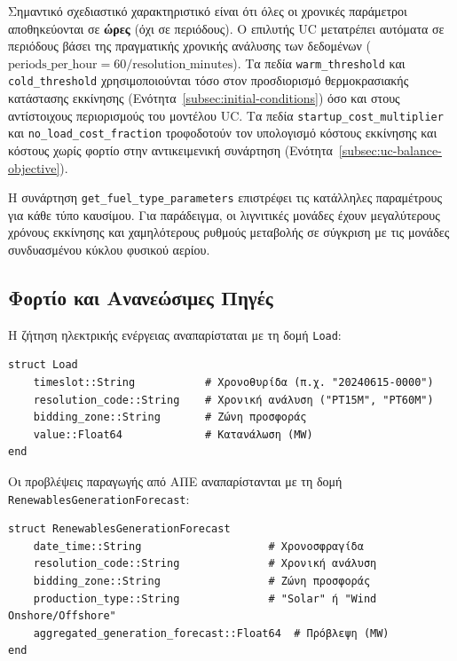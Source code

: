 Σημαντικό σχεδιαστικό χαρακτηριστικό είναι ότι όλες οι χρονικές παράμετροι αποθηκεύονται σε \textbf{ώρες} (όχι σε περιόδους). Ο επιλυτής UC μετατρέπει αυτόματα σε περιόδους βάσει της πραγματικής χρονικής ανάλυσης των δεδομένων ($\text{periods\_per\_hour} = 60 / \text{resolution\_minutes}$). Τα πεδία \texttt{warm\_threshold} και \texttt{cold\_threshold} χρησιμοποιούνται τόσο στον προσδιορισμό θερμοκρασιακής κατάστασης εκκίνησης (Ενότητα~\ref{subsec:initial-conditions}) όσο και στους αντίστοιχους περιορισμούς του μοντέλου UC. Τα πεδία \texttt{startup\_cost\_multiplier} και \texttt{no\_load\_cost\_fraction} τροφοδοτούν τον υπολογισμό κόστους εκκίνησης και κόστους χωρίς φορτίο στην αντικειμενική συνάρτηση (Ενότητα~\ref{subsec:uc-balance-objective}).

Η συνάρτηση \texttt{get\_fuel\_type\_parameters} επιστρέφει τις κατάλληλες παραμέτρους για κάθε τύπο καυσίμου. Για παράδειγμα, οι λιγνιτικές μονάδες έχουν μεγαλύτερους χρόνους εκκίνησης και χαμηλότερους ρυθμούς μεταβολής σε σύγκριση με τις μονάδες συνδυασμένου κύκλου φυσικού αερίου.

\subsection{Φορτίο και Ανανεώσιμες Πηγές}
\label{subsec:load-renewables}

Η ζήτηση ηλεκτρικής ενέργειας αναπαρίσταται με τη δομή \texttt{Load}:

\begin{samepage}
\begin{verbatim}
struct Load
    timeslot::String           # Χρονοθυρίδα (π.χ. "20240615-0000")
    resolution_code::String    # Χρονική ανάλυση ("PT15M", "PT60M")
    bidding_zone::String       # Ζώνη προσφοράς
    value::Float64             # Κατανάλωση (MW)
end
\end{verbatim}
\end{samepage}

Οι προβλέψεις παραγωγής από ΑΠΕ αναπαρίστανται με τη δομή \texttt{RenewablesGenerationForecast}:

\begin{samepage}
\begin{verbatim}
struct RenewablesGenerationForecast
    date_time::String                    # Χρονοσφραγίδα
    resolution_code::String              # Χρονική ανάλυση
    bidding_zone::String                 # Ζώνη προσφοράς
    production_type::String              # "Solar" ή "Wind Onshore/Offshore"
    aggregated_generation_forecast::Float64  # Πρόβλεψη (MW)
end
\end{verbatim}
\end{samepage}

